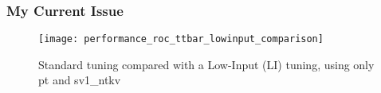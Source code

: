 \frametitle{ My Current Issue } 
\begin{figure}
    \texttt{[image: performance\_roc\_ttbar\_lowinput\_comparison]}
    \caption{Standard tuning compared with a Low-Input (LI) tuning, using only pt and sv1\_ntkv}
\end{figure}
